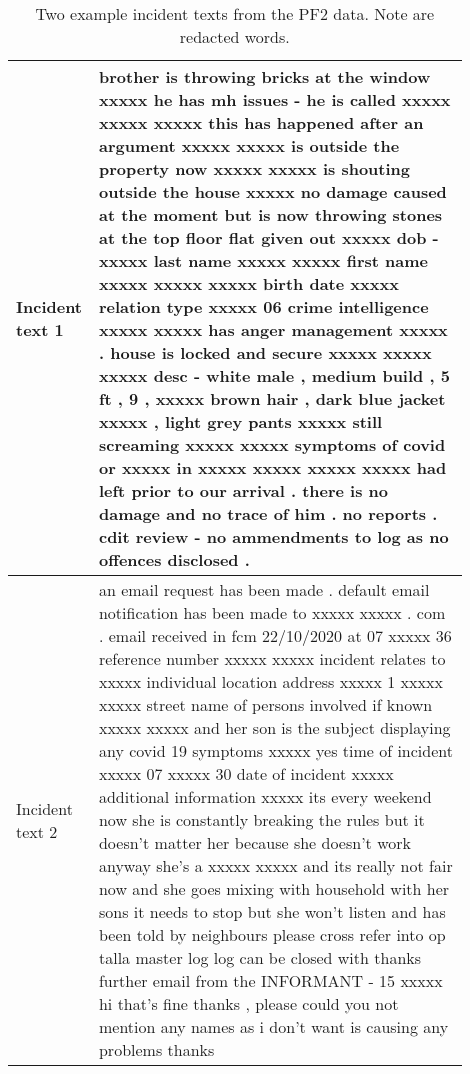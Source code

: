 \begin{table}[]
\centering
\begin{tabular}{p{0.1\linewidth}p{0.8\linewidth}}

\toprule
Incident text 1 &  brother is throwing bricks at the window xxxxx he has mh issues - he is called xxxxx xxxxx xxxxx this has happened after an argument xxxxx xxxxx is outside the property now xxxxx xxxxx is shouting outside the house xxxxx no damage caused at the moment but is now throwing stones at the top floor flat given out xxxxx dob - xxxxx last name xxxxx xxxxx first name xxxxx xxxxx xxxxx birth date xxxxx relation type xxxxx 06 crime intelligence xxxxx xxxxx has anger management xxxxx . house is locked and secure xxxxx xxxxx xxxxx desc - white male , medium build , 5 ft , 9 , xxxxx brown hair , dark blue jacket xxxxx , light grey pants xxxxx still screaming xxxxx xxxxx symptoms of covid or xxxxx in xxxxx xxxxx xxxxx xxxxx had left prior to our arrival . there is no damage and no trace of him . no reports . cdit review - no ammendments to log as no offences disclosed .                                                             \\ \midrule
Incident text 2 & an email request has been made . default email notification has been made to xxxxx xxxxx . com . email received in fcm 22/10/2020 at 07 xxxxx 36 reference number xxxxx xxxxx incident relates to xxxxx individual location address xxxxx 1 xxxxx xxxxx street name of persons involved if known xxxxx xxxxx and her son is the subject displaying any covid 19 symptoms xxxxx yes time of incident xxxxx 07 xxxxx 30 date of incident xxxxx additional information xxxxx its every weekend now she is constantly breaking the rules but it doesn't matter her because she doesn't work anyway she's a xxxxx xxxxx and its really not fair now and she goes mixing with household with her sons it needs to stop but she won't listen and has been told by neighbours please cross refer into op talla master log log can be closed with thanks further email from the INFORMANT - 15 xxxxx hi that's fine thanks , please could you not mention any names as i don't want is causing any problems thanks \\ \bottomrule
\end{tabular}
\caption[ASB Incident Log Examples]{\label{tab:example_incident} Two example incident texts from the PF2 data. Note  are redacted words. }
\end{table}




